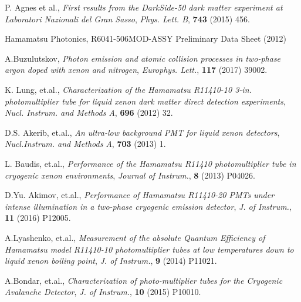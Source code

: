 \documentclass[a4paper,11pt]{article}
\begin{document}
\begin{thebibliography}{99}
P. Agnes et al., \emph{First results from the DarkSide-50 dark matter experiment at Laboratori Nazionali del Gran Sasso}, 
\emph{Phys. Lett. B}, {\bf 743} (2015) 456.

Hamamatsu Photonics, R6041-506MOD-ASSY Preliminary Data Sheet (2012) 

A.Buzulutskov, \emph{Photon emission and atomic collision processes in two-phase argon doped with xenon and nitrogen},
\emph{Europhys. Lett.}, {\bf 117} (2017) 39002.

K. Lung, et.al., \emph{Characterization of the Hamamatsu R11410-10 3-in. photomultiplier tube
for liquid xenon dark matter direct detection experiments}, \emph{Nucl. Instrum. and Methods A}, {\bf 696} (2012) 32.

D.S. Akerib, et.al., \emph{An ultra-low background PMT for liquid xenon detectors}, \emph{Nucl.Instrum. and Methods A},
{\bf 703} (2013) 1. 

L. Baudis, et.al., \emph{Performance of the Hamamatsu R11410
photomultiplier tube in cryogenic xenon
environments}, \emph{Journal of Instrum.}, {\bf 8} (2013) P04026.

D.Yu. Akimov, et.al., \emph{Performance of Hamamatsu R11410-20 PMTs under
intense illumination in a two-phase cryogenic emission
detector}, \emph{J. of Instrum.}, {\bf 11} (2016) P12005. 

A.Lyashenko, et.al., \emph{Measurement of the absolute Quantum Efficiency of
Hamamatsu model R11410-10 photomultiplier tubes
at low temperatures down to liquid xenon
boiling point}, \emph{J. of Instrum.}, {\bf 9} (2014) P11021. 

A.Bondar, et.al., \emph{Characterization of photo-multiplier tubes for the
Cryogenic Avalanche Detector}, \emph{J. of Instrum.}, {\bf 10} (2015) P10010.
\end{thebibliography}
\end{document}
